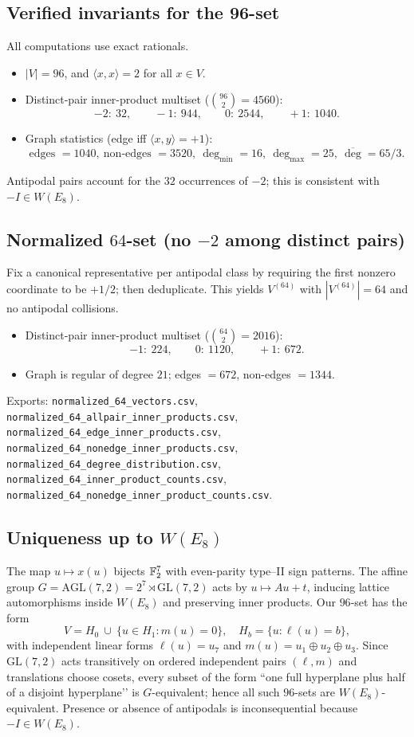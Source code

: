 \documentclass[12pt]{article}
\begin{document}
\subsection*{Verified invariants for the 96-set}
All computations use exact rationals.
\begin{itemize}\setlength\itemsep{2pt}
\item $|V|=96$, and $\langle x,x\rangle=2$ for all $x\in V$.
\item Distinct-pair inner-product multiset ($\binom{96}{2}=4560$):
\[
-2:~32,\qquad -1:~944,\qquad 0:~2544,\qquad +1:~1040.
\]
\item Graph statistics (edge iff $\langle x,y\rangle=+1$):
\[
\text{edges }=1040,\ \text{non-edges }=3520,\ 
\deg_{\min}=16,\ \deg_{\max}=25,\ \overline{\deg}=65/3.
\]
\end{itemize}
Antipodal pairs account for the $32$ occurrences of $-2$; this is consistent with $-I\in W(E_8)$.

\subsection*{Normalized $64$-set (no $-2$ among distinct pairs)}
Fix a canonical representative per antipodal class by requiring the first nonzero coordinate to be $+1/2$; then deduplicate.
This yields $V^{(64)}$ with $|V^{(64)}|=64$ and no antipodal collisions.
\begin{itemize}\setlength\itemsep{2pt}
\item Distinct-pair inner-product multiset ($\binom{64}{2}=2016$):
\[
-1:~224,\qquad 0:~1120,\qquad +1:~672.
\]
\item Graph is regular of degree $21$; edges $=672$, non-edges $=1344$.
\end{itemize}
Exports:
\texttt{normalized\_64\_vectors.csv},
\texttt{normalized\_64\_allpair\_inner\_products.csv},
\texttt{normalized\_64\_edge\_inner\_products.csv},
\texttt{normalized\_64\_nonedge\_inner\_products.csv},
\texttt{normalized\_64\_degree\_distribution.csv},
\texttt{normalized\_64\_inner\_product\_counts.csv},
\texttt{normalized\_64\_nonedge\_inner\_product\_counts.csv}.

\subsection*{Uniqueness up to $W(E_8)$}
The map $u\mapsto x(u)$ bijects $\Bbb F_2^7$ with even-parity type–II sign patterns.
The affine group $G=\mathrm{AGL}(7,2)=2^7\rtimes\mathrm{GL}(7,2)$ acts by $u\mapsto Au+t$,
inducing lattice automorphisms inside $W(E_8)$ and preserving inner products.
Our $96$-set has the form
\[
V=H_0\ \cup\ \{u\in H_1:m(u)=0\},\quad
H_b=\{u:\ell(u)=b\},
\]
with independent linear forms $\ell(u)=u_7$ and $m(u)=u_1\oplus u_2\oplus u_3$.
Since $\mathrm{GL}(7,2)$ acts transitively on ordered independent pairs $(\ell,m)$ and translations choose cosets, every
subset of the form “one full hyperplane plus half of a disjoint hyperplane’’ is $G$-equivalent; hence all such $96$-sets are $W(E_8)$-equivalent.
Presence or absence of antipodals is inconsequential because $-I\in W(E_8)$.
\end{document}
